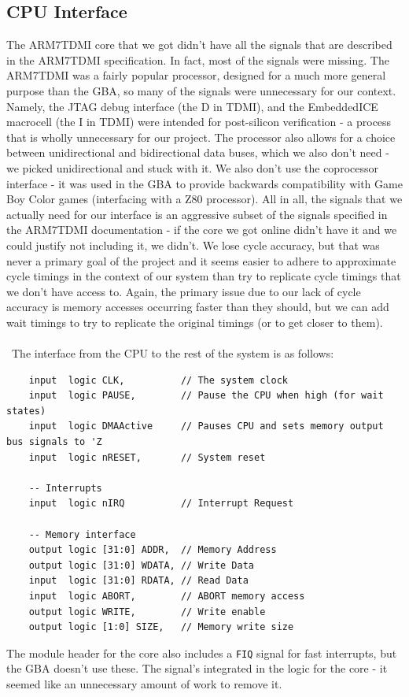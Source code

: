 \documentclass[11pt,a4paper,draft]{article}
\begin{document}
	\subsection{CPU Interface}
	The ARM7TDMI core that we got didn't have all the signals that are described in the ARM7TDMI specification. In fact, most of the signals were missing. The ARM7TDMI was a fairly popular processor, designed for a much more general purpose than the GBA, so many of the signals were unnecessary for our context. Namely, the JTAG debug interface (the D in TDMI), and the EmbeddedICE macrocell (the I in TDMI) were intended for post-silicon verification - a process that is wholly unnecessary for our project. The processor also allows for a choice between unidirectional and bidirectional data buses, which we also don't need - we picked unidirectional and stuck with it. We also don't use the coprocessor interface - it was used in the GBA to provide backwards compatibility with Game Boy Color games (interfacing with a Z80 processor). All in all, the signals that we actually need for our interface is an aggressive subset of the signals specified in the ARM7TDMI documentation - if the core we got online didn't have it and we could justify not including it, we didn't. We lose cycle accuracy, but that was never a primary goal of the project and it seems easier to adhere to approximate cycle timings in the context of our system than try to replicate cycle timings that we don't have access to. Again, the primary issue due to our lack of cycle accuracy is memory accesses occurring faster than they should, but we can add wait timings to try to replicate the original timings (or to get closer to them).\\\\\
	The interface from the CPU to the rest of the system is as follows:
	\begin{verbatim}
	input  logic CLK,          // The system clock
	input  logic PAUSE,        // Pause the CPU when high (for wait states)
	input  logic DMAActive     // Pauses CPU and sets memory output bus signals to 'Z
	input  logic nRESET,       // System reset
	
	-- Interrupts
	input  logic nIRQ          // Interrupt Request
	
	-- Memory interface
	output logic [31:0] ADDR,  // Memory Address
	output logic [31:0] WDATA, // Write Data
	input  logic [31:0] RDATA, // Read Data
	input  logic ABORT,        // ABORT memory access
	output logic WRITE,        // Write enable
	output logic [1:0] SIZE,   // Memory write size
	\end{verbatim}
	The module header for the core also includes a \texttt{FIQ} signal for fast interrupts, but the GBA doesn't use these. The signal's integrated in the logic for the core - it seemed like an unnecessary amount of work to remove it. 
	
\end{document}
